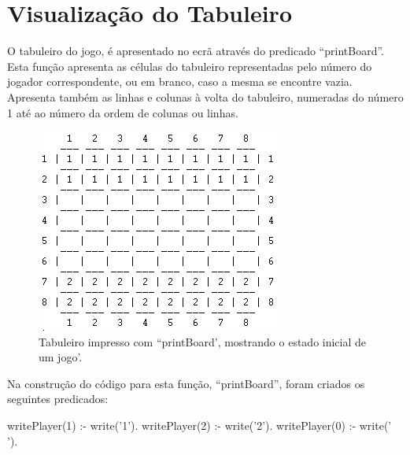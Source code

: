 \documentclass[15pt,a4paper]{article}
\begin{document}

\section{Visualização do Tabuleiro}


O tabuleiro do jogo, é apresentado no ecrã através do predicado ``printBoard''.
Esta função apresenta as células do tabuleiro representadas pelo número do jogador correspondente, ou em branco, caso a mesma se encontre vazia.
Apresenta também as linhas e colunas à volta do tabuleiro, numeradas do número 1 até ao número da ordem de colunas ou linhas.

\begin{figure}[h!]
\begin{center}
\includegraphics[scale=1]{fig_tab.png}
\caption{Tabuleiro impresso com ``printBoard', mostrando o estado inicial de um jogo'.}
\label{fig:3}
\end{center}
\end{figure}

Na construção do código para esta função, ``printBoard'', foram criados os seguintes predicados:

\begin{code}[H]
	\begin{verbatimtab}

writePlayer(1) :-
	write('1').
writePlayer(2) :-
	write('2').
writePlayer(0) :-
	write(' ').
\end{verbatimtab}
\caption{Predicado ``writePlayer' .}
\end{code}
\end{document}
